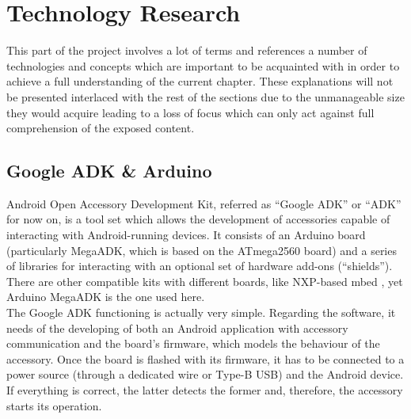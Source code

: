 	\section{Technology Research}


	This part of the project involves a lot of terms and references a number of technologies and concepts which are important to be acquainted with in order to achieve a full understanding of the current chapter. These explanations will not be presented interlaced with the rest of the sections due to the unmanageable size they would acquire leading to a loss of focus which can only act against full comprehension of the exposed content.

		\subsection{Google ADK \& Arduino}
		\label{ssec:Arduino}
			Android Open Accessory Development Kit, referred as ``Google ADK'' or ``ADK'' for now on,
			is a tool set which allows the development of accessories capable of interacting with 
			Android-running devices. It consists of an Arduino board (particularly MegaADK, which is based
			on the ATmega2560 board) and a series of libraries for interacting with an optional set of
			hardware add-ons (``shields''). There are other compatible kits with different boards, like
			NXP-based mbed \cite{mbed}, yet Arduino MegaADK is the one used here.\\
			
			The Google ADK functioning is actually very simple. Regarding the software, it needs of 
			the developing of both an Android application with accessory communication and the board's
			firmware, which models the behaviour of the accessory. Once the board is flashed with its
			firmware, it has to be connected to a power source (through a dedicated wire or Type-B USB)
			and the Android device. If everything is correct, the latter detects the former and, therefore, 
			the accessory starts its operation.\\
			
